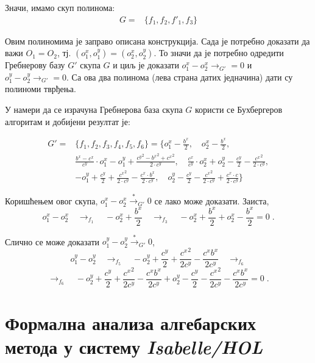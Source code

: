 \begin{primer}
\medskip
Значи, имамо скуп полинома:
\begin{align}
 G = &\{f_1, f_2, f'_1, f_3\} \nonumber
\end{align}

Овим полиномима је заправо описана конструкција. Сада је потребно
доказати да важи $O_1 = O_2$, тј. $(o^x_{1}, o^y_{1}) = (o^x_{2},
o^y_{2})$. То значи да је потребно одредити Гребнерову базу $G'$ скупа
$G$ и циљ је доказати $o^x_{1} - o^x_{2} \to_{G'} = 0$ и $o^y_{1} -
o^y_{2} \to_{G'} = 0$. Са ова два полинома (лева страна датих
једначина) дати су полиноми тврђења.

У намери да се израчуна Гребнерова база скупа $G$ користи се
Бухбергеров алгоритам и добијени резултат је:

\begin{align}
  G' = & \{f_1, f_2, f_3, f_4, f_5, f_6\} = \{ o^x_{1} - \frac{b^x}{2},\quad  o^x_{2} - \frac{b^x}{2},\nonumber \\
  &\frac{b^x-c^x}{c^y}\cdot o^x_{1} - o^y_{1} + \frac{{c^y}^2 - {b^x}^2 + {c^x}^2}{2\cdot c^y},\quad \frac{c^x}{c^y}\cdot o^x_{2} + o^y_{2} - \frac{c^y}{2} - \frac{{c^x}^2}{2\cdot c^y}, \nonumber \\
  &-o^y_{1} + \frac{c^y}{2} + \frac{{c^x}^2}{2\cdot c^y} - \frac{c^x\cdot b^x}{2\cdot
    c^y},\quad o^y_{2} - \frac{c^y}{2} - \frac{{c^x}^2}{2\cdot c^y} + \frac{c^x\cdot
    c}{2\cdot c^y} \nonumber \}
\end{align}

Коришћењем овог скупа, $o^x_{1} - o^x_{2}  \stackrel{*}{\to}_{G'} 0$ се лако може доказати. Заиста,
$$o^x_{1} - o^x_{2} \quad \to_{f_1}\quad  -o^x_{2} + \frac{b^x}{2} \quad\to_{f_3}\quad -o^x_{2} + \frac{b^x}{2} + o^x_{2} - \frac{b^x}{2} = 0\;.$$

Слично се може доказати $o^y_{1} - o^y_{2} \stackrel{*}{\to}_{G'} 0$,
$$o^y_{1} - o^y_{2} \quad \to_{f_5} \quad -o^y_{2} + \frac{c^y}{2} + \frac{{c^x}^2}{2c^y} - \frac{c^xb^x}{2c^y} \quad \to_{f_6}$$ 
$$\to_{f_6} \quad -o^y_{2} + \frac{c^y}{2} + \frac{{c^x}^2}{2c^y} - \frac{c^xb^x}{2c^y} + o^y_{2} - \frac{c^y}{2} - \frac{{c^x}^2}{2c^y} - \frac{c^xb^x}{2c^y} = 0\;.$$
\end{primer}


\section{Формална анализа алгебарских метода у систему \emph{Isabelle/HOL}}

